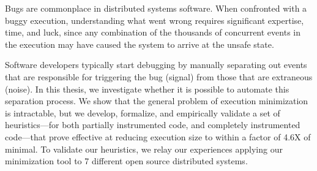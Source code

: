 
%

Bugs are commonplace in distributed systems software. When confronted with a buggy execution,
understanding what went wrong requires significant expertise, time, and luck, since any combination of the
thousands of concurrent events in the execution may have caused the system to arrive at the unsafe state.

Software developers typically
start debugging by manually separating out events that are responsible for triggering the bug (signal) from those that are extraneous (noise).
In this thesis, we investigate whether it is possible to automate this separation process. We show that the general problem of execution
minimization is intractable, but we develop, formalize, and
empirically validate a set of heuristics---for both partially instrumented code, and completely instrumented code---that prove effective at
reducing execution size to within a factor of 4.6X of minimal.
To validate our heuristics, we relay our experiences applying our minimization tool to 7 different open source distributed systems.

